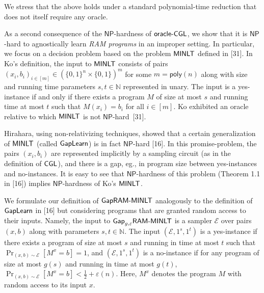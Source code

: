 \documentclass[10pt,a4paper]{article}
\begin{document}



We stress that the above holds under a standard polynomial-time reduction that does not itself require any oracle.\par




As a second consequence of the ${\mathsf{NP}}$-hardness of ${\sf oracle}\text{-}{\sf CGL}$, we show that it is ${\mathsf{NP}}$-hard to agnostically learn \emph{RAM programs} in an improper setting. In particular, we focus on a decision problem based on the problem ${\sf MINLT}$ defined in [31]. In Ko’s definition, the input to ${\sf MINLT}$ consists of pairs $(x_{i},b_{i})_{i\in[m]}\in(\{0,1\}^{n}\times\{0,1\})^{m}$ for some $m={\mathsf{poly}}(n)$ along with size and running time parameters $s,t\in\mathbb{N}$ represented in unary. The input is a yes-instance if and only if there exists a program $M$ of size at most $s$ and running time at most $t$ such that $M(x_{i})=b_{i}$ for all $i\in[m]$. Ko exhibited an oracle relative to which ${\sf MINLT}$ is not ${\mathsf{NP}}$-hard [31].\par




Hirahara, using non-relativizing techniques, showed that a certain generalization of ${\sf MINLT}$ (called ${\sf GapLearn}$) is in fact ${\mathsf{NP}}$-hard [16]. In this promise-problem, the pairs $(x_{i},b_{i})$ are represented implicitly by a sampling circuit (as in the definition of ${\sf CGL}$), and there is a gap, eg., in program size between yes-instances and no-instances. It is easy to see that ${\mathsf{NP}}$-hardness of this problem (Theorem 1.1 in [16]) implies ${\mathsf{NP}}$-hardness of Ko’s ${\sf MINLT}$.\par




We formulate our definition of ${\sf Gap}{\sf RAM}\text{-}{\sf MINLT}$ analogously to the definition of ${\sf GapLearn}$ in [16] but considering programs that are granted random access to their inputs. Namely, the input to ${\sf Gap}_{g,\varepsilon}{\sf RAM}\text{-}{\sf MINLT}$ is a sampler $\mathcal{E}$ over pairs $(x,b)$ along with parameters $s,t\in\mathbb{N}$. The input $(\mathcal{E},1^{s},1^{t})$ is a yes-instance if there exists a program of size at most $s$ and running in time at most $t$ such that $\Pr_{(x,b)\sim\mathcal{E}}[M^{x}=b]=1$, and $(\mathcal{E},1^{s},1^{t})$ is a no-instance if for any program of size at most $g(s)$ and running in time at most $g(t)$, $\Pr_{(x,b)\sim\mathcal{E}}[M^{x}=b]<\frac{1}{2}+\varepsilon(n)$. Here, $M^{x}$ denotes the program $M$ with random access to its input $x$.\par
\end{document}
